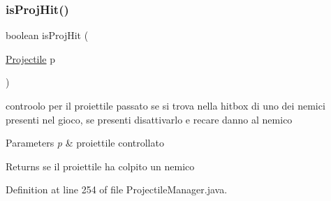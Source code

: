 \subsubsection{\texorpdfstring{is\+Proj\+Hit()}{isProjHit()}}
{\footnotesize\ttfamily boolean is\+Proj\+Hit (\begin{DoxyParamCaption}\item[{\hyperlink{classobjects_1_1_projectile}{Projectile}}]{p }\end{DoxyParamCaption})}



controolo per il proiettile passato se si trova nella hitbox di uno dei nemici presenti nel gioco, se presenti disattivarlo e recare danno al nemico 


\begin{DoxyParams}{Parameters}
{\em p} & proiettile controllato\\
\hline
\end{DoxyParams}
\begin{DoxyReturn}{Returns}
se il proiettile ha colpito un nemico 
\end{DoxyReturn}


Definition at line 254 of file Projectile\+Manager.\+java.

